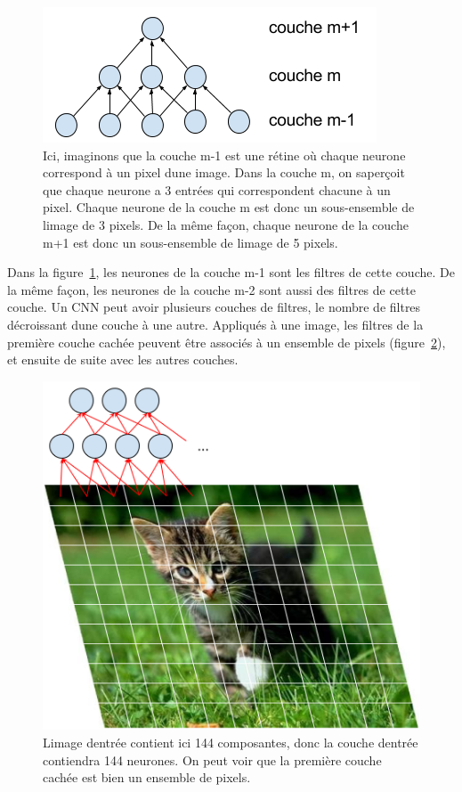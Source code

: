 \documentclass[11pt,final,ENIB]{sdm}
\begin{document}
{			\begin{figure}[!ht]
				\centering
				\includegraphics[scale=0.5,natwidth=375,natheight=152]{figures/architectureCNN.png}
				\caption{Ici, imaginons que la couche m-1 est une r\'etine o\`u chaque neurone correspond \`a un pixel d\textquotesingle une image. Dans la couche m, on s\textquotesingle aper\c coit que chaque neurone a 3 entr\'ees qui correspondent chacune \`a un pixel. Chaque neurone de la couche m est donc un sous-ensemble de l\textquotesingle image de 3 pixels. De la m\^eme fa\c con, chaque neurone de la couche m+1 est donc un sous-ensemble de l\textquotesingle image de 5 pixels.}
				\label{fig:cnn}
			\end{figure}

			Dans la figure~\ref{fig:cnn}, les neurones de la couche m-1 sont les filtres de cette couche. De la m\^eme fa\c con, les neurones de la couche m-2 sont aussi des filtres de cette couche. Un CNN peut avoir plusieurs couches de filtres, le nombre de filtres d\'ecroissant d\textquotesingle une couche \`a une autre.
			Appliqu\'es \`a une image, les filtres de la premi\`ere couche cach\'ee peuvent \^etre associ\'es \`a un ensemble de pixels (figure~\ref{fig:cnnChat}), et ensuite de suite avec les autres couches.

			\begin{figure}[!ht]
				\centering
				\includegraphics[natwidth=474,natheight=504,scale=0.4]{figures/cnnOnImage.png}
				\caption{L\textquotesingle image d\textquotesingle entr\'ee contient ici 144 composantes, donc la couche d\textquotesingle entr\'ee contiendra 144 neurones. On peut voir que la premi\`ere couche cach\'ee est bien un ensemble de pixels.}
				\label{fig:cnnChat}
			\end{figure}

}
\end{document}
